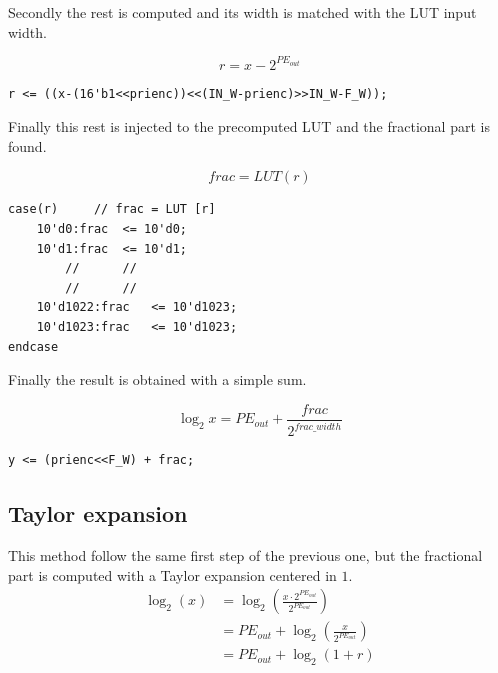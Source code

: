 \documentclass[12pt]{article}
\begin{document}
Secondly the rest is computed and its width is matched with the LUT input width.

\begin{equation}
    r=x-2^{PE_{out}}
\end{equation}  
 

\begin{lstlisting}[style={verilog-style}]
r <= ((x-(16'b1<<prienc))<<(IN_W-prienc)>>IN_W-F_W));
\end{lstlisting}

Finally this rest is injected to the precomputed LUT and the fractional part is found.

\begin{equation}
    frac=LUT(r)
\end{equation}

\begin{lstlisting}[style={verilog-style}]
case(r)     // frac = LUT [r]
    10'd0:frac  <= 10'd0;
    10'd1:frac  <= 10'd1;
        //      //   
        //      //  
    10'd1022:frac   <= 10'd1023;
    10'd1023:frac   <= 10'd1023;
endcase
\end{lstlisting}

Finally the result is obtained with a simple sum.

\begin{equation}
    \log_2{x}=PE_{out}+\frac{frac}{2^{frac \_ width}}
\end{equation}

\begin{lstlisting}[style={verilog-style}]
y <= (prienc<<F_W) + frac;
\end{lstlisting}

\subsection{Taylor expansion}
This method follow the same first step of the previous one, but the fractional part is computed with a Taylor expansion centered in $1$.
\begin{equation} 
\begin{split}
\log_2(x) & = \log_2\left(\frac{x \cdot 2^{PE_{out}}}{2^{PE_{out}}}\right) \\
 & = PE_{out} + \log_2\left(\frac{x}{2^{PE_{out}}}\right) \\
 & = PE_{out} + \log_2\left(1+r\right) \\
\end{split}
\end{equation}
\end{document}
